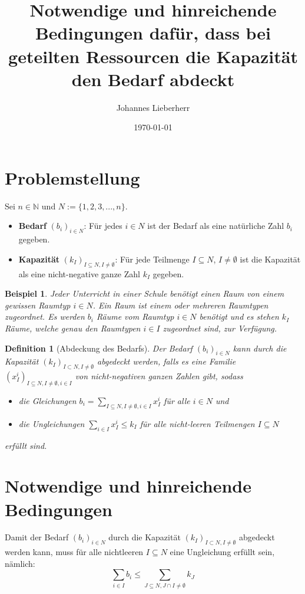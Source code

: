 \documentclass{article}
\title{Notwendige und hinreichende Bedingungen dafür, dass bei geteilten Ressourcen die Kapazität den Bedarf  abdeckt}
\author{Johannes Lieberherr}
\date{\today}
\newtheorem{definition}{Definition}
\newtheorem{example}{Beispiel}
\begin{document}
	\maketitle
	\section{Problemstellung}
	Sei $n\in \mathbb{N}$ und $N := \{1, 2, 3, ..., n\}$.
	\begin{itemize}
		\item \textbf{Bedarf} $(b_i)_{i\in N}$: Für jedes $i \in N$ ist der Bedarf als eine natürliche Zahl $b_i$ gegeben.
		\item \textbf{Kapazität} $(k_I)_{I\subseteq N, I\neq \emptyset}$: Für jede Teilmenge $I\subseteq N$, $I\neq \emptyset$ ist die Kapazität als eine nicht-negative ganze Zahl $k_I$ gegeben.
	\end{itemize}
	
	\begin{example}
		Jeder Unterricht in einer Schule benötigt einen Raum von einem gewissen Raumtyp $i\in N$. Ein Raum ist einem oder mehreren Raumtypen zugeordnet. Es werden $b_i$ Räume vom Raumtyp $i\in N$ benötigt und es stehen $k_I$ Räume, welche genau den Raumtypen $i\in I$ zugeordnet sind, zur Verfügung.
	\end{example}
	 
	
	\begin{definition}[Abdeckung des Bedarfs]
		\label{def:abdeckung_bedarf}
		Der Bedarf $(b_i)_{i\in N}$ kann durch die Kapazität $(k_I)_{I\subset N, I\neq \emptyset}$ abgedeckt werden, falls es eine Familie $(x_I^i)_{I\subseteq  N, I\neq \emptyset, i\in I}$ von nicht-negativen ganzen Zahlen  gibt, sodass
		\begin{itemize}
			\item die Gleichungen $b_i = \sum_{I\subseteq N, I\neq \emptyset, i\in I}x_I^i$ für alle $i\in N$ und
			\item die Ungleichungen $\sum_{i\in I} x_I^i \leq k_I$ für alle nicht-leeren Teilmengen $I\subseteq N$
		\end{itemize}
		erfüllt sind.
	\end{definition}
	
	
	\section{Notwendige und hinreichende Bedingungen}
		
	Damit der Bedarf $(b_i)_{i\in N}$ durch die Kapazität $(k_I)_{I\subset N, I\neq \emptyset}$ abgedeckt werden kann, muss für alle nichtleeren $I\subseteq N$ eine Ungleichung erfüllt sein, nämlich:
	\begin{equation}
			\sum_{i \in I}b_i \leq \sum_{J\subseteq N, J\cap I \neq \emptyset}k_J
			\label{eq:condition}
	\end{equation}
\end{document}
